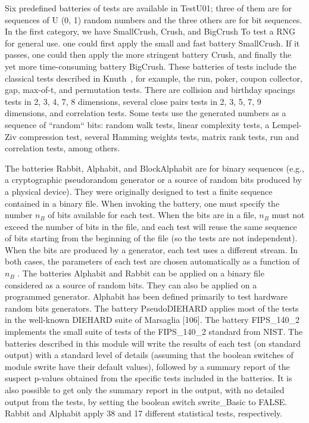 Six predefined batteries of tests are available in TestU01; three of them
are for sequences of U (0, 1) random numbers and the three others are for bit
sequences. In the first category, we have SmallCrush, Crush, and BigCrush
To test a RNG for general use.
one could first apply the small and fast battery SmallCrush. If it passes, one could then apply
the more stringent battery Crush, and finally the yet more time-consuming battery BigCrush.
These batteries of tests include the classical tests described in Knuth~\cite{Knuth1998}, for
example, the run, poker, coupon collector, gap, max-of-t, and permutation tests.
There are collision and birthday spacings tests in 2, 3, 4, 7, 8 dimensions, several close pairs tests in 2, 3, 5, 7, 9 dimensions, and correlation tests. Some
tests use the generated numbers as a sequence of ``random`` bits: random walk
tests, linear complexity tests, a Lempel-Ziv compression test, several Hamming
weights tests, matrix rank tests, run and correlation tests, among others.




The batteries Rabbit, Alphabit, and BlockAlphabit are for binary sequences
(e.g., a cryptographic pseudorandom generator or a source of random bits
produced by a physical device). They were originally designed to test a finite
sequence contained in a binary file. When invoking the battery, one must specify the number $n_B$ of bits available for each test. When the bits are in a file, $n_B$
must not exceed the number of bits in the file, and each test will reuse the same
sequence of bits starting from the beginning of the file (so the tests are not independent). When the bits are produced by a generator, each test uses a different
stream. In both cases, the parameters of each test are chosen automatically as
a function of $n_B$ .
The batteries Alphabit and Rabbit can be applied on a binary file considered as a source
of random bits. They can also be applied on a programmed generator. Alphabit has been
defined primarily to test hardware random bits generators. The battery PseudoDIEHARD
applies most of the tests in the well-known DIEHARD suite of Marsaglia [106]. The battery
FIPS\_140\_2 implements the small suite of tests of the FIPS\_140\_2 standard from NIST.
The batteries described in this module will write the results of each test (on standard
output) with a standard level of details (assuming that the boolean switches of module
swrite have their default values), followed by a summary report of the suspect p-values
obtained from the specific tests included in the batteries. It is also possible to get only the
summary report in the output, with no detailed output from the tests, by setting the boolean
switch swrite\_Basic to FALSE. Rabbit and Alphabit apply 38 and 17 different statistical tests,
respectively. 

